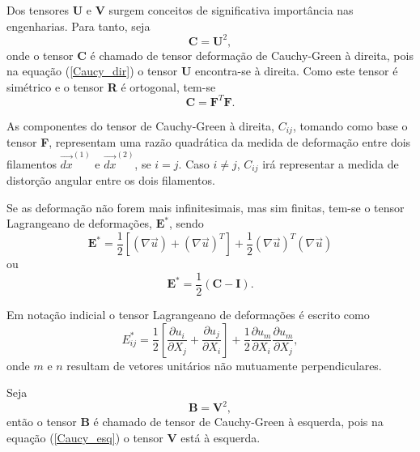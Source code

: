 Dos tensores \textbf{U} e \textbf{V} surgem conceitos de significativa importância nas engenharias. Para tanto, seja
\begin{equation}
	\textbf{C} = \textbf{U} ^{2},
\end{equation}
onde o tensor \textbf{C} é chamado de tensor deformação de Cauchy-Green à direita, pois na equação (\ref{Caucy_dir}) o tensor \textbf{U} encontra-se à direita. Como este tensor é simétrico e o tensor \textbf{R} é ortogonal, tem-se
\begin{equation} \label{CG_direita}
	\textbf{C} = \textbf{F} ^{T} \textbf{F}.
\end{equation}

As componentes do tensor de Cauchy-Green à direita, $ C_{ij} $, tomando como base o tensor \textbf{F}, representam uma razão quadrática da medida  de deformação entre dois filamentos $ \vec{dx} ^{ (1)} $ e $ \vec{dx} ^{ (2)} $, se $ i=j $. Caso $ i \neq j $, $ C_{ij} $ irá representar a medida de distorção angular entre os dois filamentos.

Se as deformação não forem mais infinitesimais, mas sim finitas, tem-se o tensor Lagrangeano de deformações, $ \textbf{E} ^{*}$, sendo
\begin{equation}
	\textbf{E} ^{*} = \dfrac{1}{2} [( { \nabla} \vec{u}) + ( { \nabla} \vec{u}) ^{T}] + \dfrac{1}{2} ( { \nabla} \vec{u}) ^{T} ( { \nabla} \vec{u})
\end{equation}  
ou
\begin{equation}
	\textbf{E} ^{*} = \dfrac{1}{2} ( \textbf{C} - \textbf{I}).
\end{equation}

Em notação indicial o tensor Lagrangeano de deformações é escrito como
\begin{equation}
	E_{ij} ^{*} = \dfrac{1}{2} \left[ \dfrac{ \partial u_{i}}{ \partial X_{j}} + \dfrac{ \partial u_{j}}{ \partial X_{i}} \right] + \dfrac{1}{2} \dfrac{ \partial u_{m}}{ \partial X_{i}}  \dfrac{ \partial u_{m}}{ \partial X_{j}},
\end{equation}
onde $m$ e $n$ resultam de vetores unitários não mutuamente perpendiculares.

Seja \begin{equation}
	\textbf{B} = \textbf{V} ^{2},
\end{equation}
então o tensor \textbf{B} é chamado de tensor de Cauchy-Green à esquerda, pois na equação (\ref{Caucy_esq}) o tensor \textbf{V} está à esquerda. 

